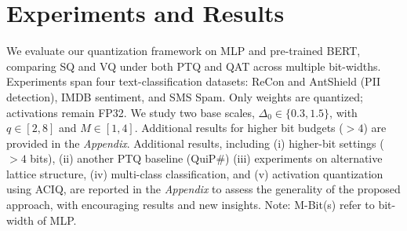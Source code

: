\documentclass{article}
\theoremstyle{definition}
\theoremstyle{remark}
\begin{document}


\section{Experiments and Results}
We evaluate our quantization framework on MLP and pre-trained BERT, comparing SQ and VQ under both PTQ and QAT across multiple bit-widths. Experiments span four text-classification datasets: ReCon and AntShield (PII detection), IMDB sentiment, and SMS Spam. Only weights are quantized; activations remain FP32. We study two base scales, $\Delta_0 \in\{0.3,1.5\}$, with $q \in [2,8]$ and $M \in [1,4]$. Additional results for higher bit budgets ($>4$) are provided in the \textit{Appendix}. {Additional results, including (i) higher-bit settings ($>4$ bits), (ii) another PTQ baseline (QuiP\#) (iii) experiments on alternative lattice structure, (iv) multi-class classification, and (v) activation quantization using ACIQ, are reported in the \textit{Appendix} to assess the generality of the proposed approach, with encouraging results and new insights. Note: M-Bit(s) refer to bit-width of MLP.}
\end{document}
